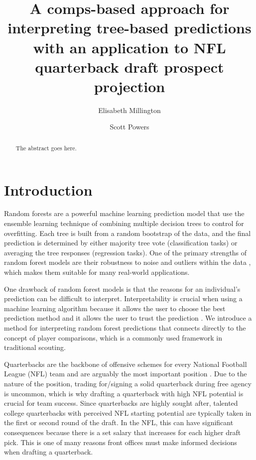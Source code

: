 \documentclass{article}
\title{A comps-based approach for interpreting tree-based predictions with an application to NFL quarterback draft prospect projection}
\author[1]{Elisabeth Millington}
\author[2]{Scott Powers}
\affil[1]{Department of Kinesiology, Rice University}
\affil[2]{Department of Sport Management, Rice University}
\begin{document}
\maketitle

\begin{abstract}
  The abstract goes here.
\end{abstract}

\section{Introduction}

Random forests are a powerful machine learning prediction model that use the ensemble learning technique of combining multiple decision trees to control for overfitting. Each tree is built from a random bootstrap of the data, and the final prediction is determined by either majority tree vote (classification tasks) or averaging the tree responses (regression tasks). One of the primary strengths of random forest models are their robustness to noise and outliers within the data \citep{breiman_random_2001}, which makes them suitable for many real-world applications.

One drawback of random forest models is that the reasons for an individual's prediction can be difficult to interpret. Interpretability is crucial when using a machine learning algorithm because it allows the user to choose the best prediction method and it allows the user to trust the prediction \citep{ribeiro_why_2016}.  We introduce a method for interpreting random forest predictions that connects directly to the concept of player comparisons, which is a commonly used framework in traditional scouting. %

Quarterbacks are the backbone of offensive schemes for every National Football League (NFL) team and are arguably the most important position \citep{hughes_positional_2015}. Due to the nature of the position, trading for/signing a solid quarterback during free agency is uncommon, which is why drafting a quarterback with high NFL potential is crucial for team success. Since quarterbacks are highly sought after, talented college quarterbacks with perceived NFL starting potential are typically taken in the first or second round of the draft. In the NFL, this can have significant consequences because there is a set salary that increases for each higher draft pick. This is one of many reasons front offices must make informed decisions when drafting a quarterback.
\end{document}
